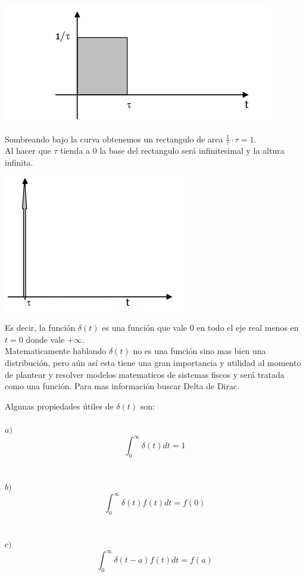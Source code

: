 \documentclass[]{article}
\begin{document}
	\includegraphics{../../../Imagenes/Superior/Superior06.PNG}
	
	Sombreando bajo la curva obtenemos un rectangulo de area $\frac{1}{\tau} \cdot \tau = 1$.\\
	Al hacer que $\tau$ tienda a $0$ la base del rectangulo será infinitesimal y la altura infinita.
	
	\includegraphics{../../../Imagenes/Superior/Superior07.PNG}

Es decir, la función $\delta(t)$ es una función que vale $0$ en todo el eje real menos en $t = 0$ donde vale $+\infty$.\\
Matematicamente hablando $\delta(t)$ no es una función sino mas bien una distribución, pero aún así esta tiene una gran importancia y utilidad al momento de plantear y resolver modelos matematicos de sistemas fiscos y será tratada como una función. Para mas información buscar Delta de Dirac.

Algunas propiedades útiles de $\delta(t)$ son:
\\
\\
$a)$
$$
\int_{0}^{\infty} \delta(t) dt = 1
$$
\\
\\
$b)$
$$
\int_{0}^{\infty} \delta(t)f(t) dt = f(0)
$$
\\
\\
$c)$
$$
\int_{0}^{\infty} \delta(t-a)f(t) dt = f(a)
$$
\\
\\
\\
\end{document}
